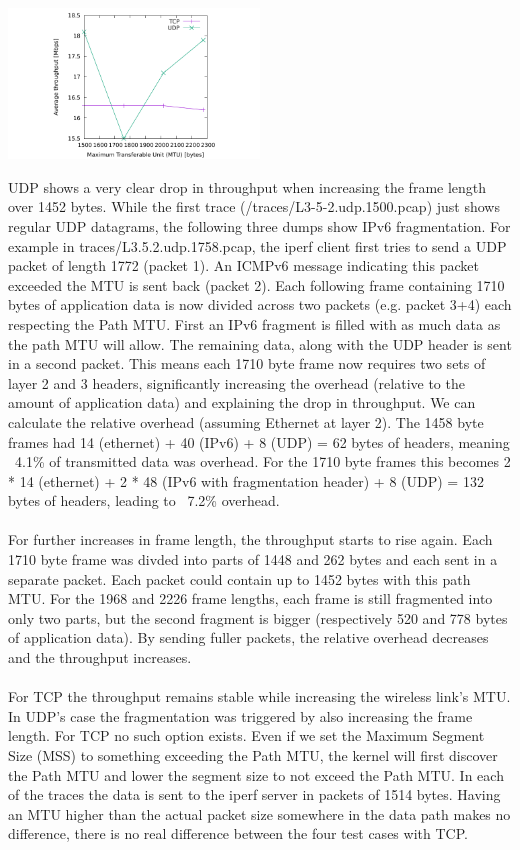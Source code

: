\includegraphics[width=0.5\textwidth]{traces/L3-5-2-tput.pdf}

UDP shows a very clear drop in throughput when increasing the frame length over 1452 bytes. While the first trace (/traces/L3-5-2.udp.1500.pcap) just shows regular UDP datagrams, the following three dumps show IPv6 fragmentation. For example in traces/L3.5.2.udp.1758.pcap, the iperf client first tries to send a UDP packet of length 1772 (packet 1). An ICMPv6 message indicating this packet exceeded the MTU is sent back (packet 2). Each following frame containing 1710 bytes of application data is now divided across two packets (e.g. packet 3+4) each respecting the Path MTU. First an IPv6 fragment is filled with as much data as the path MTU will allow. The remaining data, along with the UDP header is sent in a second packet. This means each 1710 byte frame now requires two sets of layer 2 and 3 headers, significantly increasing the overhead (relative to the amount of application data) and explaining the drop in throughput. We can calculate the relative overhead (assuming Ethernet at layer 2). The 1458 byte frames had 14 (ethernet) + 40 (IPv6) + 8 (UDP) = 62 bytes of headers, meaning ~4.1\% of transmitted data was overhead. For the 1710 byte frames this becomes 2 * 14 (ethernet) + 2 * 48 (IPv6 with fragmentation header) + 8 (UDP) = 132 bytes of headers, leading to ~7.2\% overhead. \\ \\ For further increases in frame length, the throughput starts to rise again. Each 1710 byte frame was divded into parts of 1448 and 262 bytes and each sent in a separate packet. Each packet could contain up to 1452 bytes with this path MTU. For the 1968 and 2226 frame lengths, each frame is still fragmented into only two parts, but the second fragment is bigger (respectively 520 and 778 bytes of application data). By sending fuller packets, the relative overhead decreases and the throughput increases. \\ \\
For TCP the throughput remains stable while increasing the wireless link's MTU. In UDP's case the fragmentation was triggered by also increasing the frame length. For TCP no such option exists. Even if we set the Maximum Segment Size (MSS) to something exceeding the Path MTU, the kernel will first discover the Path MTU and lower the segment size to not exceed the Path MTU. In each of the traces the data is sent to the iperf server in packets of 1514 bytes. Having an MTU higher than the actual packet size somewhere in the data path makes no difference, there is no real difference between the four test cases with TCP.

